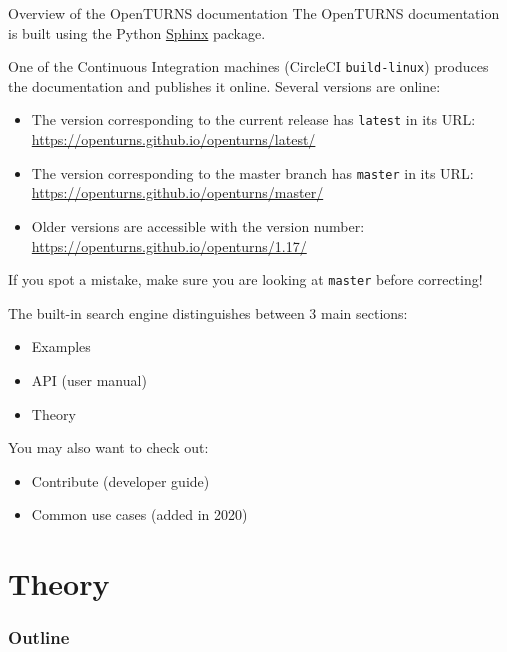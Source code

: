 \documentclass[8pt]{beamer}
\begin{document}
\begin{frame}{Overview of the OpenTURNS documentation}
The OpenTURNS documentation is built using the Python \href{https://www.sphinx-doc.org/en/master/index.html}{\alert{Sphinx}} package.

One of the Continuous Integration machines (CircleCI \texttt{build-linux})
produces the documentation and publishes it online.
Several versions are online:

\begin{itemize}
\item The version corresponding to the current release has \alert{\texttt{latest}} in its URL:
\url{https://openturns.github.io/openturns/latest/}
\item The version corresponding to the master branch has \alert{\texttt{master}} in its URL:
\url{https://openturns.github.io/openturns/master/}
\item Older versions are accessible with the version number: \url{https://openturns.github.io/openturns/1.17/}
\end{itemize}

If you spot a mistake, make sure you are looking at \texttt{master} before correcting!

The built-in search engine distinguishes between 3 main sections:

\begin{itemize}
    \item \alert{Examples}
    \item \alert{API} (user manual)
    \item \alert{Theory}
\end{itemize}

You may also want to check out:

\begin{itemize}
    \item \alert{Contribute} (developer guide)
    \item \alert{Common use cases} (added in 2020)
\end{itemize}
\end{frame}

\section{Theory}

\begin{frame}[label=tableofcontents]
\frametitle{Outline}
\tableofcontents[currentsection]
\end{frame}
\end{document}
